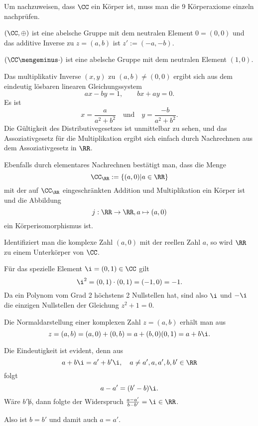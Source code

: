 \message{ !name(master.tex)}\documentclass[a4paper,10pt,openany,bibtotoc,indextotoc,liststotoc]
{lehrbuch17x24}
\begin{document}
\begin{antwort}
Um nachzuweisen, dass $\CC$ ein Körper ist, muss man die 9 Körperaxiome einzeln nachprüfen. 

$(\CC,\oplus)$ ist eine abelsche Gruppe mit dem neutralen Element $0=(0,0)$ und das 
additive Inverse zu $z=(a,b)$ ist $z':=(-a,-b)$. 

$(\CC\mengeminus \cdot)$ ist eine abelsche Gruppe mit dem neutralen Element $(1,0)$. 

Das multiplikativ Inverse $(x,y)$ zu $(a,b) \not= (0,0)$ ergibt sich 
aus dem eindeutig lösbaren linearen Gleichungssystem 
\[
ax-by = 1, \qquad bx+ay = 0.
\]
Es ist 
\[
x=\frac{a}{a^2+b^2}\quad\text{und}\quad
y=\frac{-b}{a^2+b^2}.
\]
Die Gültigkeit des Distributivegesetzes ist unmittelbar zu sehen, 
und das Assoziativgesetz für die Multiplikation ergibt sich einfach 
durch Nachrechnen aus dem Assoziativgesetz in $\RR$.

Ebenfalls durch elementares Nachrechnen bestätigt man, dass die Menge 
\[
\CC_{\RR} := \left\{ (a,0) | a\in\RR \right\}
\]
mit der auf $\CC_{\RR}$ eingeschränkten Addition und Multiplikation ein Körper ist 
und die Abbildung 
\[
j: \RR\to\RR, a \mapsto (a,0)
\]
ein Körperisomorphismus ist.

Identifiziert man die komplexe Zahl $(a,0)$ mit der reellen Zahl $a$, 
so wird $\RR$ zu einem Unterkörper von $\CC$.

Für das spezielle Element $\i=(0,1) \in \CC$ gilt 
\[
\i^2 = (0,1) \cdot (0,1) = (-1,0) = -1.
\]
Da ein Polynom vom Grad 2 höchstens 2 Nullstellen hat, sind also $\i$ und 
$-\i$ die einzigen Nullstellen der Gleichung $z^2 +1=0$. 

Die Normaldarstellung einer komplexen Zahl $z=(a,b)$ erhält man aus 
\[
z=(a,b) = (a,0) + (0,b) = a + (b,0) (0,1) = a+b\i.
\]

Die Eindeutigkeit ist evident, denn aus 
\[
a+b\i = a'+b'\i, \quad a\not=a', a,a',b,b' \in\RR
\]
folgt 
\[
a-a' = (b'-b) \i.
\]
Wäre $b'\not b$, dann folgte der Widerspruch $\frac{a-a'}{b-b'} = \i \in\RR$.

Also ist $b=b'$ und damit auch $a=a'$.   

\end{antwort}
\end{document}
